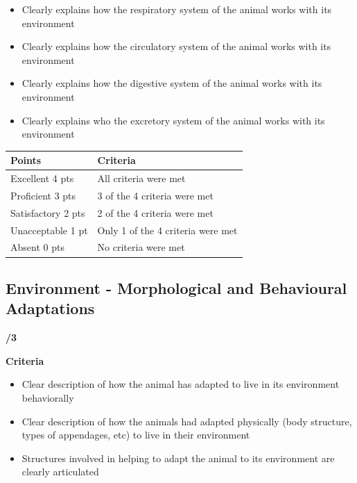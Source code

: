 \documentclass[
]{book}
\providecommand{\tightlist}{%
  \setlength{\itemsep}{0pt}\setlength{\parskip}{0pt}}
\begin{document}
\begin{itemize}
\tightlist
\item
  Clearly explains how the respiratory system of the animal works with its environment
\item
  Clearly explains how the circulatory system of the animal works with its environment
\item
  Clearly explains how the digestive system of the animal works with its environment
\item
  Clearly explains who the excretory system of the animal works with its environment
\end{itemize}

\begin{longtable}[]{@{}ll@{}}
\toprule
Points & Criteria \\
\midrule
\endhead
Excellent 4 pts & All criteria were met \\
Proficient 3 pts & 3 of the 4 criteria were met \\
Satisfactory 2 pts & 2 of the 4 criteria were met \\
Unacceptable 1 pt & Only 1 of the 4 criteria were met \\
Absent 0 pts & No criteria were met \\
\bottomrule
\end{longtable}

\hypertarget{environment---morphological-and-behavioural-adaptations}{%
\subsection*{Environment - Morphological and Behavioural Adaptations}\label{environment---morphological-and-behavioural-adaptations}}

\textbf{/3}

\textbf{Criteria}

\begin{itemize}
\tightlist
\item
  Clear description of how the animal has adapted to live in its environment behaviorally
\item
  Clear description of how the animals had adapted physically (body structure, types of appendages, etc) to live in their environment
\item
  Structures involved in helping to adapt the animal to its environment are clearly articulated
\end{itemize}
\end{document}

